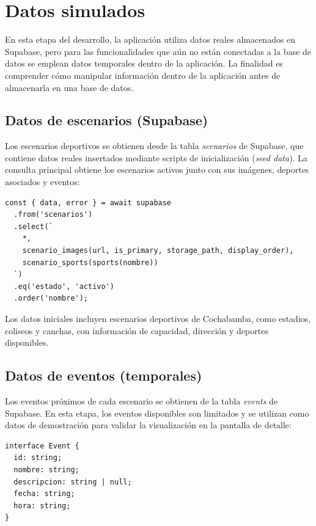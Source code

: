 
\section{Datos simulados}

En esta etapa del desarrollo, la aplicaci\'on utiliza datos reales almacenados
en Supabase, pero para las funcionalidades que a\'un no est\'an conectadas a la
base de datos se emplean datos temporales dentro de la aplicaci\'on. La
finalidad es comprender c\'omo manipular informaci\'on dentro de la aplicaci\'on
antes de almacenarla en una base de datos.

\subsection{Datos de escenarios (Supabase)}

Los escenarios deportivos se obtienen desde la tabla \textit{scenarios} de
Supabase, que contiene datos reales insertados mediante scripts de
inicializaci\'on (\textit{seed data}). La consulta principal obtiene los
escenarios activos junto con sus im\'agenes, deportes asociados y eventos:

\begin{lstlisting}
const { data, error } = await supabase
  .from('scenarios')
  .select(`
    *,
    scenario_images(url, is_primary, storage_path, display_order),
    scenario_sports(sports(nombre))
  `)
  .eq('estado', 'activo')
  .order('nombre');
\end{lstlisting}

Los datos iniciales incluyen escenarios deportivos de Cochabamba, como
estadios, coliseos y canchas, con informaci\'on de capacidad, direcci\'on y
deportes disponibles.

\subsection{Datos de eventos (temporales)}

Los eventos pr\'oximos de cada escenario se obtienen de la tabla
\textit{events} de Supabase. En esta etapa, los eventos disponibles son
limitados y se utilizan como datos de demostraci\'on para validar la
visualizaci\'on en la pantalla de detalle:

\begin{lstlisting}
interface Event {
  id: string;
  nombre: string;
  descripcion: string | null;
  fecha: string;
  hora: string;
}
\end{lstlisting}


